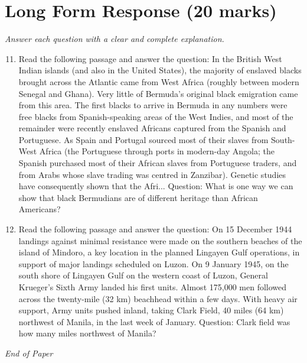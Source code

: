 \documentclass[12pt]{article}
\begin{document}
\section*{Long Form Response (20 marks)}
\textit{Answer each question with a clear and complete explanation.}
\begin{enumerate}[label=\arabic*.]
\setcounter{enumi}{10}
\item Read the following passage and answer the question: In the British West Indian islands (and also in the United States), the majority of enslaved blacks brought across the Atlantic came from West Africa (roughly between modern Senegal and Ghana). Very little of Bermuda's original black emigration came from this area. The first blacks to arrive in Bermuda in any numbers were free blacks from Spanish-speaking areas of the West Indies, and most of the remainder were recently enslaved Africans captured from the Spanish and Portuguese. As Spain and Portugal sourced most of their slaves from South-West Africa (the Portuguese through ports in modern-day Angola; the Spanish purchased most of their African slaves from Portuguese traders, and from Arabs whose slave trading was centred in Zanzibar). Genetic studies have consequently shown that the Afri... Question: What is one way we can show that black Bermudians are of different heritage than African Americans?
\item Read the following passage and answer the question: On 15 December 1944 landings against minimal resistance were made on the southern beaches of the island of Mindoro, a key location in the planned Lingayen Gulf operations, in support of major landings scheduled on Luzon. On 9 January 1945, on the south shore of Lingayen Gulf on the western coast of Luzon, General Krueger's Sixth Army landed his first units. Almost 175,000 men followed across the twenty-mile (32 km) beachhead within a few days. With heavy air support, Army units pushed inland, taking Clark Field, 40 miles (64 km) northwest of Manila, in the last week of January. Question: Clark field was how many miles northwest of Manila?
\end{enumerate}

\vfill
\noindent\textit{End of Paper}
\end{document}
